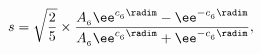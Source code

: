 \begin{equation}
s = \sqrt{2\over 5} \times {A_{_6} \ee^{c_{_6} \radim} - \ee^{-c_{_6}
\radim} \over {A_{_6} \ee^{c_{_6} \radim} + \ee^{-c_{_6} \radim}}},
\label{sol6}
\end{equation}

